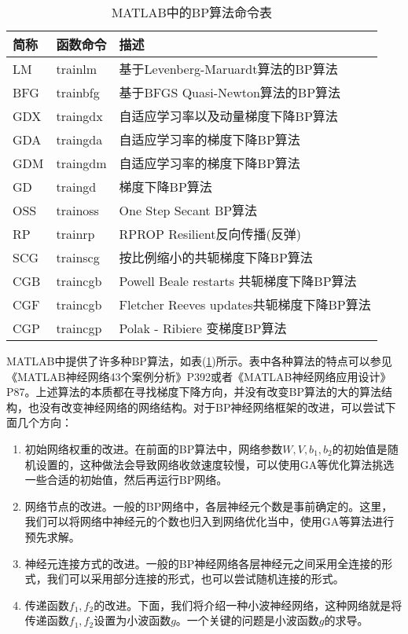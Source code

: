             \begin{table}[htbp]
              \caption{MATLAB中的BP算法命令表}
              \label{tab:MATLAB中的BP算法命令表}
              \centering
              \begin{tabular}{l l l}
              \toprule
              简称     & 函数命令   & 描述                                     \\
              \midrule
              LM       & trainlm    & 基于Levenberg-Maruardt算法的BP算法       \\
              BFG      & trainbfg   & 基于BFGS Quasi-Newton算法的BP算法        \\
              GDX      & traingdx   & 自适应学习率以及动量梯度下降BP算法       \\
              GDA      & traingda   & 自适应学习率的梯度下降BP算法             \\
              GDM      & traingdm   & 自适应学习率的梯度下降BP算法             \\
              GD       & traingd    & 梯度下降BP算法                           \\
              OSS      & trainoss   & One Step Secant BP算法                   \\
              RP       & trainrp    & RPROP Resilient反向传播(反弹)          \\
              SCG      & trainscg   & 按比例缩小的共轭梯度下降BP算法           \\
              CGB      & traincgb   & Powell Beale restarts 共轭梯度下降BP算法 \\
              CGF      & traincgb   & Fletcher Reeves updates共轭梯度下降BP算法\\
              CGP      & traincgp   & Polak - Ribiere 变梯度BP算法             \\
              \bottomrule
              \end{tabular}
            \end{table}
            \par
            MATLAB中提供了许多种BP算法，如表(\ref{tab:MATLAB中的BP算法命令表})所示。表中各种算法的特点可以参见《MATLAB神经网络43个案例分析》P392或者《MATLAB神经网络应用设计》P87。上述算法的本质都在寻找梯度下降方向，并没有改变BP算法的大的算法结构，也没有改变神经网络的网络结构。对于BP神经网络框架的改进，可以尝试下面几个方向：
            \begin{enumerate}
            \item 初始网络权重的改进。在前面的BP算法中，网络参数$W,V,b_1,b_2$的初始值是随机设置的，这种做法会导致网络收敛速度较慢，可以使用GA等优化算法挑选一些合适的初始值，然后再运行BP网络。
            \item 网络节点的改进。一般的BP网络中，各层神经元个数是事前确定的。这里，我们可以将网络中神经元的个数也归入到网络优化当中，使用GA等算法进行预先求解。
            \item 神经元连接方式的改进。一般的BP神经网络各层神经元之间采用全连接的形式，我们可以采用部分连接的形式，也可以尝试随机连接的形式。
            \item 传递函数$f_1,f_2$的改进。下面，我们将介绍一种小波神经网络，这种网络就是将传递函数$f_1,f_2$设置为小波函数$g$。一个关键的问题是小波函数$g$的求导。
            \end{enumerate}
